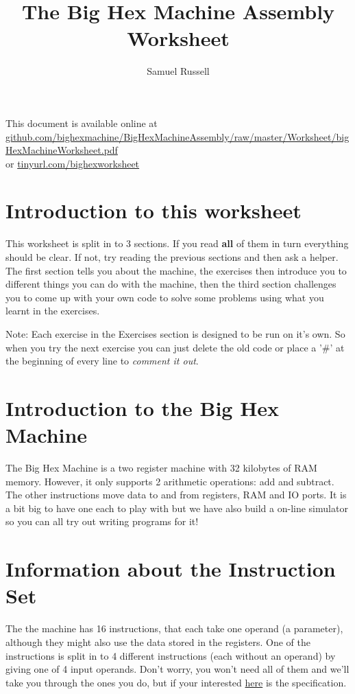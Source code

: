 \documentclass[10pt,a4paper]{article}
\author{Samuel Russell}
\title{The Big Hex Machine Assembly Worksheet}
\begin{document}
\maketitle

This document is available online at\\ \href{http://github.com/bighexmachine/BigHexMachineAssembly/raw/master/Worksheet/bigHexMachineWorksheet.pdf}{github.com/bighexmachine/BigHexMachineAssembly/raw/master/Worksheet/bigHexMachineWorksheet.pdf}\\or \href{http://tinyurl.com/bighexworksheet}{tinyurl.com/bighexworksheet}

\section*{Introduction to this worksheet}
This worksheet is split in to 3 sections. If you read \textbf{all} of them in turn everything should be clear. If not, try reading the previous sections and then ask a helper. The first section tells you about the machine, the exercises then introduce you to different things you can do with the machine, then the third section challenges you to come up with your own code to solve some problems using what you learnt in the exercises.

Note: Each exercise in the Exercises section is designed to be run on it's own. So when you try the next exercise you can just delete the old code or place a '\#' at the beginning of every line to \textit{comment it out}.

\section{Introduction to the Big Hex Machine}
The Big Hex Machine is a two register machine with 32 kilobytes of RAM memory. However, it only supports 2 arithmetic operations: add and subtract. The other instructions move data to and from registers, RAM and IO ports. It is a bit big to have one each to play with but we have also build a on-line simulator so you can all try out writing programs for it!

\section{Information about the Instruction Set}
The the machine has 16 instructions, that each take one operand (a parameter), although they might also use the data stored in the registers. One of the instructions is split in to 4 different instructions (each without an operand) by giving one of 4 input operands. Don't worry, you won't need all of them and we'll take you through the ones you do, but if your interested \href{https://bighexmachine.github.io/BigHexOnlineSimulator/assemblySpec.pdf}{here} is the specification.\\
\end{document}
